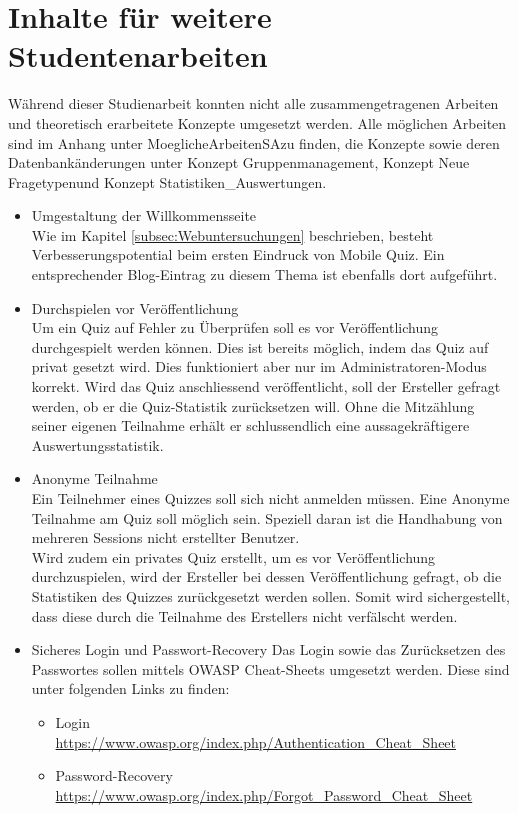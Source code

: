 \section{Inhalte für weitere Studentenarbeiten}
\label{sec:InhalteFuerStudentenarbeiten}

Während dieser Studienarbeit konnten nicht alle zusammengetragenen Arbeiten und theoretisch erarbeitete Konzepte umgesetzt werden. Alle möglichen Arbeiten sind im Anhang unter \glqq MoeglicheArbeitenSA\grqq zu finden, die Konzepte sowie deren Datenbankänderungen unter \glqq Konzept Gruppenmanagement\grqq, \glqq Konzept Neue Fragetypen\grqq und \glqq Konzept Statistiken\_Auswertungen\grqq.
		


\begin{itemize}
	\item Umgestaltung der Willkommensseite \\
	Wie im Kapitel \ref{subsec:Webuntersuchungen} beschrieben, besteht Verbesserungspotential beim ersten Eindruck von Mobile Quiz. Ein entsprechender Blog-Eintrag zu diesem Thema ist ebenfalls dort aufgeführt.
	
	\item Durchspielen vor Veröffentlichung \\
	Um ein Quiz auf Fehler zu Überprüfen soll es vor Veröffentlichung durchgespielt werden können. Dies ist bereits möglich, indem das Quiz auf privat gesetzt wird. Dies funktioniert aber nur im Administratoren-Modus korrekt.
	Wird das Quiz anschliessend veröffentlicht, soll der Ersteller gefragt werden, ob er die Quiz-Statistik zurücksetzen will. Ohne die Mitzählung seiner eigenen Teilnahme erhält er schlussendlich eine aussagekräftigere Auswertungsstatistik.
	
	\item Anonyme Teilnahme \\
	Ein Teilnehmer eines Quizzes soll sich nicht anmelden müssen. Eine Anonyme Teilnahme am Quiz soll möglich sein. Speziell daran ist die Handhabung von mehreren Sessions nicht erstellter Benutzer.\\
	Wird zudem ein privates Quiz erstellt, um es vor Veröffentlichung durchzuspielen, wird der Ersteller bei dessen Veröffentlichung gefragt, ob die Statistiken des Quizzes zurückgesetzt werden sollen. Somit wird sichergestellt, dass diese durch die Teilnahme des Erstellers nicht verfälscht werden.
	
	\item Sicheres Login und Passwort-Recovery
	Das Login sowie das Zurücksetzen des Passwortes sollen mittels OWASP Cheat-Sheets umgesetzt werden. Diese sind unter folgenden Links zu finden:
	\begin{itemize}
		\item Login \\
		\url{https://www.owasp.org/index.php/Authentication_Cheat_Sheet}
		\item Password-Recovery \\ \url{https://www.owasp.org/index.php/Forgot_Password_Cheat_Sheet}
	\end{itemize}
	

\end{itemize}
